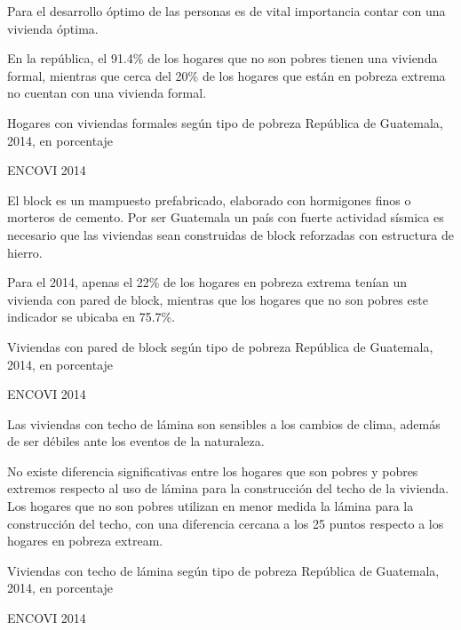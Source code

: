 
{%
	Para el desarrollo óptimo de las personas es de vital importancia contar con una vivienda óptima. 
	
	En la república, el 91.4\% de los hogares que no son pobres tienen una vivienda formal, mientras que cerca del 20\%  de los hogares que están en pobreza extrema no cuentan con una vivienda formal.  
 }%
{%
 Hogares con viviendas formales según tipo de pobreza} %
{%
 República de Guatemala, 2014, en porcentaje} %
{%
 \begin{tikzpicture}[x=1pt,y=1pt]    \end{tikzpicture}}%
{%
 ENCOVI 2014} %


%
{%
	El block es un mampuesto prefabricado, elaborado con hormigones finos o morteros de cemento. Por ser Guatemala un país con fuerte actividad sísmica es necesario que las viviendas sean construidas de block reforzadas con estructura de hierro. 
	
	Para el 2014, apenas el 22\% de los hogares en pobreza extrema tenían un vivienda con pared de block, mientras que los hogares que  no son pobres este indicador se ubicaba en 75.7\%. 
}%
{%
	Viviendas con pared de block según tipo de pobreza} %
{%
	República de Guatemala, 2014, en porcentaje} %
{%
	\begin{tikzpicture}[x=1pt,y=1pt]    \end{tikzpicture}}%
{%
	ENCOVI 2014} %


%
{%
	Las viviendas con techo de lámina son sensibles a los cambios de clima, además de ser débiles ante los eventos de la naturaleza. 
	
	No existe diferencia significativas entre los hogares que son pobres y pobres extremos respecto al uso de lámina para la construcción del techo de la vivienda. Los hogares que no son pobres utilizan en menor medida la lámina para la construcción del techo, con una diferencia cercana a los 25 puntos respecto a los hogares en pobreza extream. 
	
	
}%
{%
	Viviendas con techo de lámina  según tipo de pobreza} %
{%
	República de Guatemala, 2014, en porcentaje} %
{%
	\begin{tikzpicture}[x=1pt,y=1pt]    \end{tikzpicture}}%
{%
	ENCOVI 2014} %

